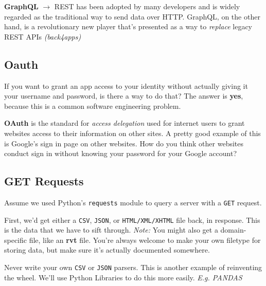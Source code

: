 \documentclass[english, 10pt]{article}
\begin{document}
\begin{tcolorbox}[title=Aside: GRAPHQL,colframe=black,colback=white,arc=0pt,fonttitle=\bfseries]
\textbf{GraphQL} $\rightarrow$ REST has been adopted by many developers and is widely regarded as the traditional way to send data over HTTP. GraphQL, on the other hand, is a revolutionary new player that's presented as a way to \textit{replace} legacy REST APIs \textit{(back4apps)}
\end{tcolorbox}

\subsection{Oauth}

If you want to grant an app access to your identity without actually giving it your username and password, is there a way to do that? The answer is \textbf{yes}, because this is a common software engineering problem.\newline

\textbf{OAuth} is the standard for \textit{access delegation} used for internet users to grant websites access to their information on other sites. A pretty good example of this is Google's sign in page on other websites. How do you think other websites conduct sign in without knowing your password for your Google account?

\subsection{GET Requests}

Assume we used Python's \texttt{requests} module to query a server with a \texttt{GET} request.\newline

First, we'd get either a \texttt{CSV}, \texttt{JSON}, or \texttt{HTML/XML/XHTML} file back, in response. This is the data that we have to sift through. \textit{Note:} You might also get a domain-specific file, like an \textbf{rvt} file. You're always welcome to make your own filetype for storing data, but make sure it's actually documented somewhere.\newline

\begin{tcolorbox}[title=Aside: Parsing CSVs and JSON,colframe=black,colback=white,arc=0pt,fonttitle=\bfseries]
Never write your own \texttt{CSV} or \texttt{JSON} parsers. This is another example of reinventing the wheel. We'll use Python Libraries to do this more easily. \textit{E.g. PANDAS}
\end{tcolorbox}
\end{document}
